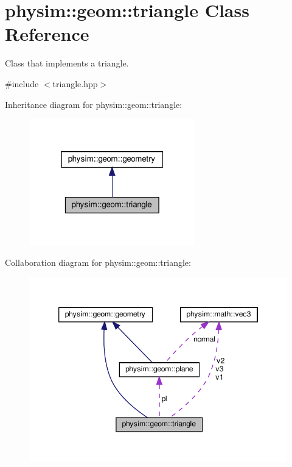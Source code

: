 \hypertarget{classphysim_1_1geom_1_1triangle}{}\section{physim\+:\+:geom\+:\+:triangle Class Reference}
\label{classphysim_1_1geom_1_1triangle}


Class that implements a triangle.  




{\ttfamily \#include $<$triangle.\+hpp$>$}



Inheritance diagram for physim\+:\+:geom\+:\+:triangle\+:\nopagebreak
\begin{figure}[H]
\begin{center}
\leavevmode
\includegraphics[width=205pt]{classphysim_1_1geom_1_1triangle__inherit__graph}
\end{center}
\end{figure}


Collaboration diagram for physim\+:\+:geom\+:\+:triangle\+:\nopagebreak
\begin{figure}[H]
\begin{center}
\leavevmode
\includegraphics[width=346pt]{classphysim_1_1geom_1_1triangle__coll__graph}
\end{center}
\end{figure}
